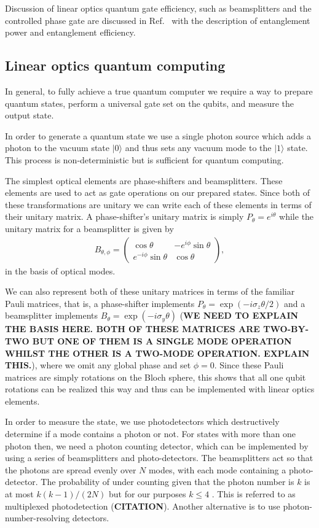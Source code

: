 \documentclass[aps,pra,twocolumn,amsmath,amssymb,nofootinbib,superscriptaddress]{revtex4}
\newcommand{\ket}[1]{|#1\rangle}
\begin{document}
Discussion of linear optics quantum gate efficiency, such as beamsplitters and the controlled phase gate are discussed in Ref.~\cite{lemr} with the description of entanglement power and entanglement efficiency.

\subsection{Linear optics quantum computing}

In general, to fully achieve a true quantum computer we require a way to prepare quantum states, perform a universal gate set on the qubits, and measure the output state.

In order to generate a quantum state we use a single photon source which adds a photon to the vacuum state $\ket{0}$ and thus sets any vacuum mode to the $\ket{1}$ state. This process is non-deterministic but is sufficient for quantum computing.

The simplest optical elements are phase-shifters and beamsplitters. These elements are used to act as gate operations on our prepared states. Since both of these transformations are unitary we can write each of these elements in terms of their unitary matrix. A phase-shifter's unitary matrix is simply $P_\theta = e^{i \theta}$ while the unitary matrix for a beamsplitter is given by
\begin{eqnarray}
B_{\theta,\phi}=
\left(
\begin{array}{cc}
\cos{\theta}& -e^{i \phi} \sin{\theta} \\
e^{-i \phi} \sin{\theta}& \cos{\theta} 
\end{array}
\right),
\end{eqnarray}
in the basis of optical modes.

We can also represent both of these unitary matrices in terms of the familiar Pauli matrices, that is, a phase-shifter implements $P_\theta = \exp{(-i \sigma_z \theta/2)}$ and a beamsplitter implements $B_\theta = \exp{(-i \sigma_y \theta)}$ (\textbf{WE NEED TO EXPLAIN THE BASIS HERE. BOTH OF THESE MATRICES ARE TWO-BY-TWO BUT ONE OF THEM IS A SINGLE MODE OPERATION WHILST THE OTHER IS A TWO-MODE OPERATION. EXPLAIN THIS.}), where we omit any global phase and set $\phi=0$. Since these Pauli matrices are simply rotations on the Bloch sphere, this shows that all one qubit rotations can be realized this way and thus can be implemented with linear optics elements.

In order to measure the state, we use photodetectors which destructively determine if a mode contains a photon or not. For states with more than one photon then, we need a photon counting detector, which can be implemented by using a series of beamsplitters and photo-detectors. The beamsplitters act so that the photons are spread evenly over $N$ modes, with each mode containing a photo-detector. The probability of under counting given that the photon number is $k$ is at most $k(k-1)/(2N)$ but for our purposes $k \le 4 $ \cite{knill}. This is referred to as multiplexed photodetection (\textbf{CITATION}). Another alternative is to use photon-number-resolving detectors.
\end{document}
